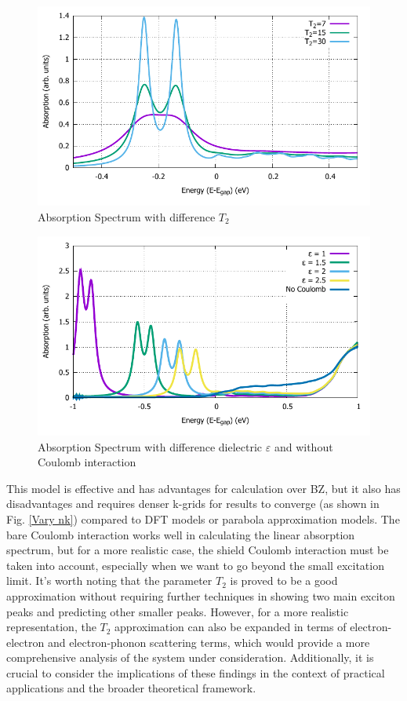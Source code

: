 \documentclass[12pt,english,a4paper]{article}
\begin{document}
\begin{figure}
	\begin{center}
		\includegraphics[width=0.75\linewidth]{images/varyT2.pdf}
		\caption[Absorption Spectrum with difference $T_2$]{Absorption Spectrum with difference $T_2$}
		\label{Vary T2}
	\end{center}
\end{figure}\null
\begin{figure}
	\begin{center}
		\includegraphics[width=0.75\linewidth]{images/varyepsilon.pdf}
		\caption[Absorption Spectrum with difference dielectric $\varepsilon$ and without Coulomb interaction]{Absorption Spectrum with difference dielectric $\varepsilon$ and without Coulomb interaction}
		\label{Vary e}
	\end{center}
\end{figure}\null
\quad This model is effective and has advantages for calculation over BZ, but it also has disadvantages and requires denser k-grids for results to converge (as shown in Fig. \ref{Vary nk}) compared to DFT models or parabola approximation models. The bare Coulomb interaction works well in calculating the linear absorption spectrum, but for a more realistic case, the shield Coulomb interaction must be taken into account\cite{erben_excitation-induced_2018,erben_optical_2022}, especially when we want to go beyond the small excitation limit. It's worth noting that the parameter $T_2$ is proved to be a good approximation without requiring further techniques in showing two main exciton peaks and predicting other smaller peaks. However, for a more realistic representation, the $T_2$ approximation can also be expanded in terms of electron-electron and electron-phonon scattering terms, which would provide a more comprehensive analysis of the system under consideration. Additionally, it is crucial to consider the implications of these findings in the context of practical applications and the broader theoretical framework.
\end{document}
